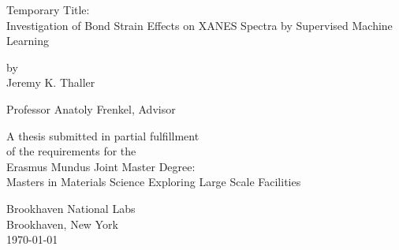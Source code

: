 \documentclass[12pt, oneside]{book}
\begin{document}
\begin{titlepage}
\begin{center}

\vspace*{2cm}

{\huge Temporary Title: \\ Investigation of Bond Strain Effects on XANES Spectra by Supervised Machine
	Learning} %

\vspace{2cm}

{\large by\\Jeremy K. Thaller}

\vspace{2cm}
{Professor Anatoly Frenkel, Advisor}

\vfill

A thesis submitted in partial fulfillment\\
of the requirements for the\\
Erasmus Mundus Joint Master Degree: \\
Masters in Materials Science Exploring Large Scale Facilities

\vspace*{3cm}

Brookhaven National Labs\\
Brookhaven, New York\\
\today %
\end{center}
\end{titlepage}

\frontmatter 


\end{document}

